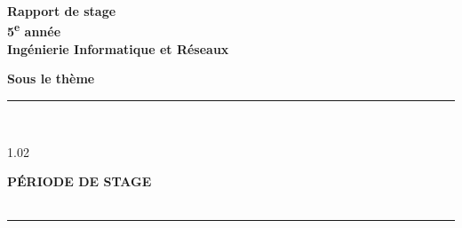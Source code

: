\begin{titlepage}
\begin{minipage}[t][0.945\textheight]{0.91\textwidth}
        \vspace*{2.35cm}

        \vspace{0.65cm}
        \begin{center}
            {\LARGE\bfseries Rapport de stage}\\[0.12cm]
            {\large\bfseries 5\textsuperscript{e} année}\\[0.08cm]
            {\large\bfseries Ingénierie Informatique et Réseaux}

            \vspace{0.72cm}

            {\large\bfseries Sous le thème}\\[0.22cm]
            \rule{0.56\linewidth}{0.45pt}

            \vspace{0.42cm}

            {\fontsize{23}{25}\selectfont\bfseries \projectname}\\[0.24cm]

            \begin{minipage}{0.82\linewidth}
                \centering
                \begin{spacing}{1.02}
                    {\fontsize{12}{14}\selectfont\bfseries
                    \reporttitle}
                \end{spacing}
            \end{minipage}

            \vspace{0.58cm}

            {\large\bfseries PÉRIODE DE STAGE}\\[0.14cm]
            {\normalsize \internshipperiod}\\[0.20cm]
            \rule{0.56\linewidth}{0.45pt}
        \end{center}

        \vspace{0.82cm}
        \hspace*{-0.25cm}
        \begin{minipage}{0.90\textwidth}
            \raggedright
            \setlength{\parindent}{0pt}


\end{minipage}
\end{minipage}
\end{titlepage}
